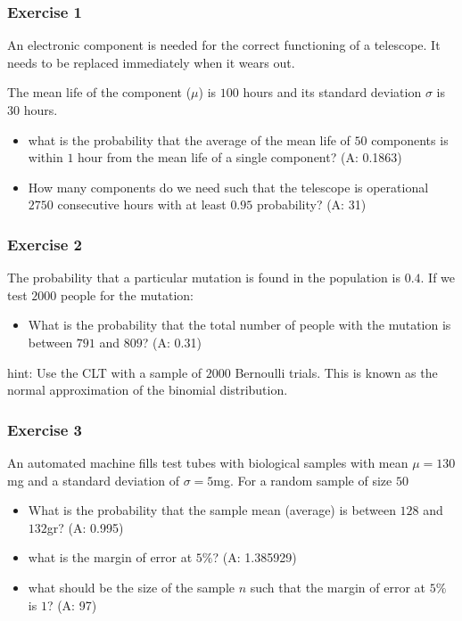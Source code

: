 \documentclass[
]{book}
\providecommand{\tightlist}{%
  \setlength{\itemsep}{0pt}\setlength{\parskip}{0pt}}
\begin{document}
\hypertarget{exercise-1-8}{%
\subsubsection{Exercise 1}\label{exercise-1-8}}

An electronic component is needed for the correct functioning of a telescope. It needs to be replaced immediately when it wears out.

The mean life of the component (\(\mu\)) is \(100\) hours and its standard deviation \(\sigma\) is \(30\) hours.

\begin{itemize}
\item
  what is the probability that the average of the mean life of \(50\) components is within \(1\) hour from the mean life of a single component? (A: 0.1863)
\item
  How many components do we need such that the telescope is operational \(2750\) consecutive hours with at least \(0.95\) probability? (A: 31)
\end{itemize}

\hypertarget{exercise-2-8}{%
\subsubsection{Exercise 2}\label{exercise-2-8}}

The probability that a particular mutation is found in the population is \(0.4\). If we test \(2000\) people for the mutation:

\begin{itemize}
\tightlist
\item
  What is the probability that the total number of people with the mutation is between \(791\) and \(809\)? (A: 0.31)
\end{itemize}

hint: Use the CLT with a sample of \(2000\) Bernoulli trials. This is known as the normal approximation of the binomial distribution.

\hypertarget{exercise-3-6}{%
\subsubsection{Exercise 3}\label{exercise-3-6}}

An automated machine fills test tubes with biological samples with mean \(\mu=130\)mg and a standard deviation of \(\sigma=5\)mg. For a random sample of size \(50\)

\begin{itemize}
\item
  What is the probability that
  the sample mean (average) is between \(128\) and \(132\)gr? (A: 0.995)
\item
  what is the margin of error at \(5\%\)? (A: 1.385929)
\item
  what should be the size of the sample \(n\) such that the margin of error at \(5\%\) is \(1\)?
  (A: 97)
\end{itemize}
\end{document}
